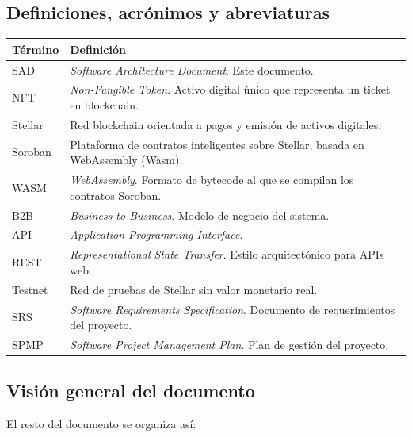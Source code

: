 \documentclass[12pt,oneside]{article}
\begin{document}
\subsection{Definiciones, acrónimos y abreviaturas}
\label{subsec:definiciones}

\begin{longtable}{@{}p{3.5cm} p{11cm}@{}}
  \toprule
  \textbf{Término} & \textbf{Definición}\\
  \midrule
  \endhead
  \bottomrule
  \endfoot
  SAD & \textit{Software Architecture Document}. Este documento.\\
  NFT & \textit{Non-Fungible Token}. Activo digital único que representa un ticket en blockchain.\\
  Stellar & Red blockchain orientada a pagos y emisión de activos digitales.\\
  Soroban & Plataforma de contratos inteligentes sobre Stellar, basada en WebAssembly (Wasm).\\
  WASM & \textit{WebAssembly}. Formato de bytecode al que se compilan los contratos Soroban.\\
  B2B & \textit{Business to Business}. Modelo de negocio del sistema.\\
  API & \textit{Application Programming Interface}.\\
  REST & \textit{Representational State Transfer}. Estilo arquitectónico para APIs web.\\
  Testnet & Red de pruebas de Stellar sin valor monetario real.\\
  SRS & \textit{Software Requirements Specification}. Documento de requerimientos del proyecto.\\
  SPMP & \textit{Software Project Management Plan}. Plan de gestión del proyecto.\\
\end{longtable}

\subsection{Visión general del documento}
\label{subsec:vision-general}

El resto del documento se organiza así:
\end{document}
